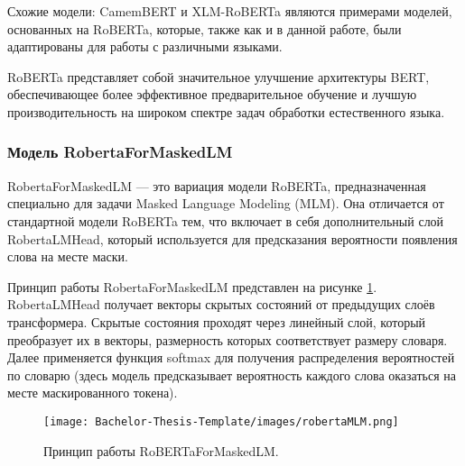 \newline Схожие модели: CamemBERT и XLM-RoBERTa являются примерами моделей, основанных на RoBERTa, которые, также как и в данной работе, были адаптированы для работы с различными языками.

\newline RoBERTa представляет собой значительное улучшение архитектуры BERT, обеспечивающее более эффективное предварительное обучение и лучшую производительность на широком спектре задач обработки естественного языка.

\subsubsection{Модель RobertaForMaskedLM} %

RobertaForMaskedLM \cite{roberta_huggingface} — это вариация модели RoBERTa, предназначенная специально для задачи Masked Language Modeling (MLM). Она отличается от стандартной модели RoBERTa тем, что включает в себя дополнительный слой RobertaLMHead, который используется для предсказания вероятности появления слова на месте маски.



\newline Принцип работы RobertaForMaskedLM представлен на рисунке \ref{fig:RoBERTaForMaskedLM}. RobertaLMHead получает векторы скрытых состояний от предыдущих слоёв трансформера. Скрытые состояния проходят через линейный слой, который преобразует их в векторы, размерность которых соответствует размеру словаря. Далее применяется функция softmax для получения распределения вероятностей по словарю (здесь модель предсказывает вероятность каждого слова оказаться на месте маскированного токена). 

\begin{figure}[!h]
    \centering
    \texttt{[image: Bachelor-Thesis-Template/images/robertaMLM.png]}
    \caption{\small Принцип работы RoBERTaForMaskedLM.}
    \label{fig:RoBERTaForMaskedLM}
\end{figure}


